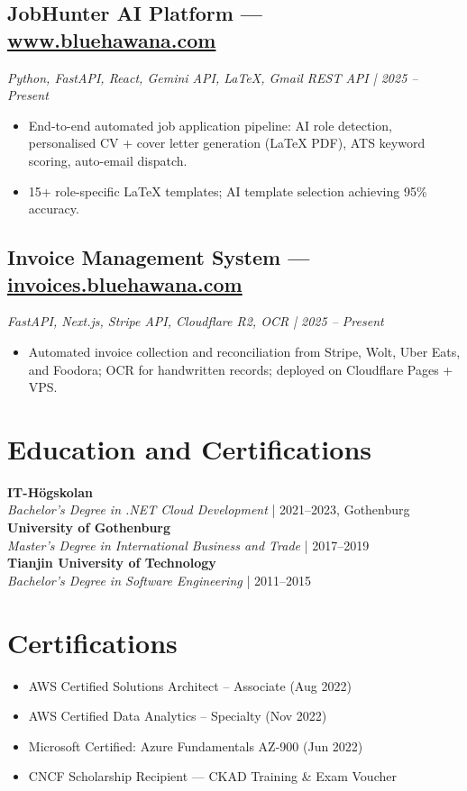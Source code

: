 \documentclass[a4paper,10pt]{article}
\begin{document}
\subsection*{JobHunter AI Platform --- \href{https://www.bluehawana.com}{www.bluehawana.com}}
\textit{Python, FastAPI, React, Gemini API, LaTeX, Gmail REST API | 2025 -- Present}
\begin{itemize}[noitemsep]
  \item End-to-end automated job application pipeline: AI role detection, personalised
        CV + cover letter generation (LaTeX PDF), ATS keyword scoring, auto-email dispatch.
  \item 15+ role-specific LaTeX templates; AI template selection achieving 95\% accuracy.
\end{itemize}

\subsection*{Invoice Management System --- \href{https://invoices.bluehawana.com}{invoices.bluehawana.com}}
\textit{FastAPI, Next.js, Stripe API, Cloudflare R2, OCR | 2025 -- Present}
\begin{itemize}[noitemsep]
  \item Automated invoice collection and reconciliation from Stripe, Wolt, Uber Eats,
        and Foodora; OCR for handwritten records; deployed on Cloudflare Pages + VPS.
\end{itemize}

\section*{Education and Certifications}

\textbf{IT-Högskolan}\\
\textit{Bachelor's Degree in .NET Cloud Development} | 2021--2023, Gothenburg\\[4pt]
\textbf{University of Gothenburg}\\
\textit{Master's Degree in International Business and Trade} | 2017--2019\\[4pt]
\textbf{Tianjin University of Technology}\\
\textit{Bachelor's Degree in Software Engineering} | 2011--2015

\section*{Certifications}
\begin{itemize}[noitemsep]
  \item AWS Certified Solutions Architect -- Associate (Aug 2022)
  \item AWS Certified Data Analytics -- Specialty (Nov 2022)
  \item Microsoft Certified: Azure Fundamentals AZ-900 (Jun 2022)
  \item CNCF Scholarship Recipient --- CKAD Training \& Exam Voucher
\end{itemize}
\end{document}
